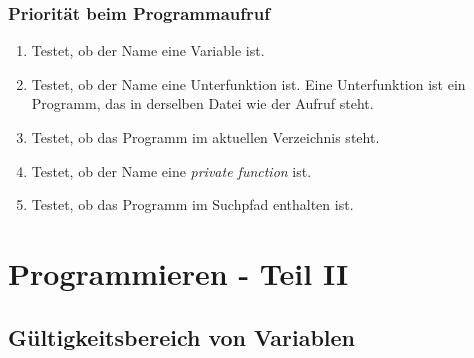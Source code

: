 \begin{frame}[fragile]\frametitle{Priorität beim Programmaufruf}
\begin{enumerate}
\item  Testet, ob der Name eine Variable ist.
\item  Testet, ob der Name eine Unterfunktion ist. Eine
  Unterfunktion ist ein Programm, das in derselben Datei wie der
  Aufruf steht.
\item  Testet, ob das Programm im aktuellen Verzeichnis steht.
\item  Testet, ob der Name eine {\it private function} ist.
\item  Testet, ob das Programm im Suchpfad enthalten ist. 
\end{enumerate}
\end{frame}


\section{Programmieren - Teil II}
\subsection{Gültigkeitsbereich von Variablen}
 

